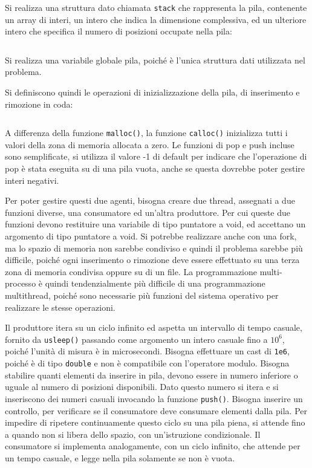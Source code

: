 \documentclass{article}
\numberwithin{equation}{subsection}
\begin{document}
Si realizza una struttura dato chiamata \verb|stack| che rappresenta la pila, 
contenente un array di interi, un intero che indica la dimensione complessiva, ed un 
ulteriore intero che specifica il numero di posizioni occupate nella pila:
\inputminted[firstline=1, lastline=14]{c}{./"Programmazione Concorrente"/consumatore_produttore.c}
Si realizza una variabile globale 
pila, poiché è l'unica struttura dati utilizzata nel problema. 

Si definiscono quindi le operazioni di inizializzazione della pila, di inserimento e rimozione 
in coda:
\inputminted[firstline=16, lastline=36]{c}{./"Programmazione Concorrente"/consumatore_produttore.c}
A differenza della funzione \verb|malloc()|, la funzione \verb|calloc()| inizializza 
tutti i valori della zona di memoria allocata a zero. Le funzioni di pop e 
push incluse sono semplificate, si utilizza il valore -1 di default per indicare 
che l'operazione di pop è stata eseguita su di una pila vuota, anche se questa dovrebbe 
poter gestire interi negativi. 

Per poter gestire questi due agenti, bisogna creare due thread, assegnati a due funzioni 
diverse, una consumatore ed un'altra produttore. Per cui queste due funzioni devono 
restituire una variabile di tipo puntatore a void, ed accettano un argomento 
di tipo puntatore a void. 
Si potrebbe realizzare anche con una fork, ma lo spazio di memoria non sarebbe 
condiviso e quindi il problema sarebbe più difficile, poiché ogni inserimento 
o rimozione deve essere effettuato su una terza zona di memoria condivisa 
oppure su di un file. La programmazione multi-processo è quindi 
tendenzialmente più difficile di una programmazione multithread, poiché sono 
necessarie più funzioni del sistema operativo per realizzare le stesse 
operazioni. 

Il produttore itera su un ciclo infinito ed aspetta un intervallo di tempo 
casuale, fornito da \verb|usleep()| passando come argomento un intero 
casuale fino a $10^6$, poiché l'unità di misura è in microsecondi. 
Bisogna effettuare un cast di \verb|1e6|, poiché è di tipo \verb|double| e non 
è compatibile con l'operatore modulo. Bisogna stabilire 
quanti elementi da inserire in pila, devono essere in numero inferiore o uguale 
al numero di posizioni disponibili. Dato questo numero si 
itera e si inseriscono dei numeri casuali invocando la funzione \verb|push()|. 
Bisogna inserire un controllo, per verificare se il consumatore deve consumare 
elementi dalla pila. Per impedire di ripetere continuamente questo ciclo 
su una pila piena, si attende fino a quando non si libera dello spazio, 
con un'istruzione condizionale. 
Il consumatore si implementa analogamente, con un ciclo infinito, che 
attende per un tempo casuale, e legge nella pila solamente se non è vuota. 
\end{document}
